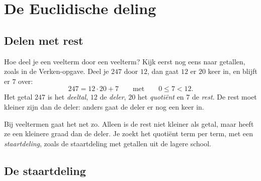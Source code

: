 

\begin{oefeningen}
\end{oefeningen}

\section{De Euclidische deling}

\subsection{Delen met rest}

Hoe deel je een veelterm door een veelterm? Kijk eerst nog eens naar getallen, zoals in de Verken-opgave. Deel je $247$ door $12$, dan gaat $12$ er $20$ keer in, en blijft er $7$ over:
\[247 = 12 \cdot 20 + 7 \qquad\text{met}\qquad 0 \leqslant 7 < 12.\]
Het getal $247$ is het \textit{deeltal}, $12$ de \textit{deler}, $20$ het \textit{quotiënt} en $7$ de \textit{rest}. De rest moet kleiner zijn dan de deler: anders gaat de deler er nog een keer in.

Bij veeltermen gaat het net zo. Alleen is de rest niet kleiner als getal, maar heeft ze een kleinere graad dan de deler. Je zoekt het quotiënt term per term, met een \textit{staartdeling}, zoals de staartdeling met getallen uit de lagere school.

\subsection{De staartdeling}

